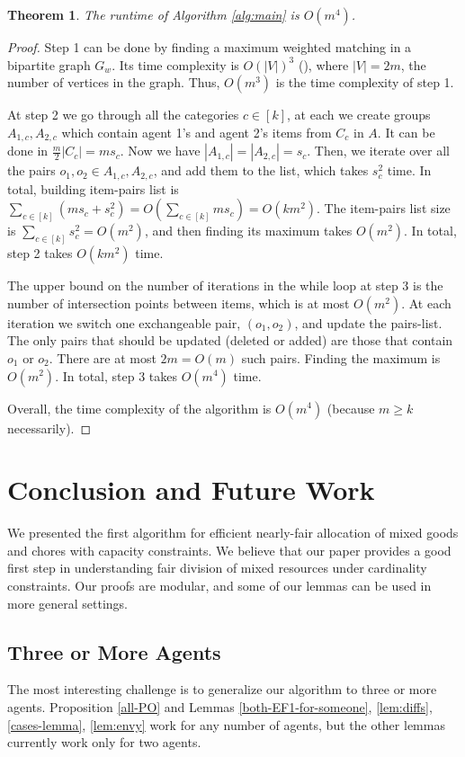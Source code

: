 \documentclass[sigconf]{aamas}
\newtheorem{theorem}{Theorem}[section]
\theoremstyle{definition}
\begin{document}
\begin{theorem}
\label{runtime}
    The runtime of Algorithm \ref{alg:main} is $O(m^4)$.
\end{theorem}
\begin{proof}
Step 1 can be done by finding a maximum weighted matching in a bipartite graph $G_w$. Its time complexity is $O(|V|)^3$ (\citet{fredman1987}), where $|V|=2m$, the number of vertices in the graph.
Thus, $O(m^3)$ is the time complexity of step 1.

At step 2 we go through all the categories $c\in [k]$, at each we create groups $A_{1,c},A_{2,c}$ which contain agent 1's and agent 2's items from $C_c$ in $A$.
It can be done in $\frac{m}{2}|C_c|=ms_c$. 
Now we have $|A_{1,c}|=|A_{2,c}|=s_c$.
Then, we iterate over all the pairs $o_1,o_2\in A_{1,c},A_{2,c}$, and add them to the list, which takes $s_c^2$ time.
In total, building item-pairs list is 
$\sum_{c\in [k]}(ms_c+s_c^2) = O(\sum_{c\in [k]}ms_c) = O(km^2)$.
The item-pairs list size is $\sum_{c\in [k]}s_c^2=O(m^2)$, and then finding its maximum takes $O(m^2)$.
In total, step 2 takes $O(km^2)$ time.

The upper bound on the number of iterations in the while loop at step 3 is the number of intersection points between items, which is at most $O(m^2)$.
At each iteration we switch one exchangeable pair, $(o_1,o_2)$, and update the pairs-list. The only pairs that should be updated (deleted or added) are those that contain $o_1$ or $o_2$. There are at most $2 m=O(m)$ such pairs.
Finding the maximum is $O(m^2)$.
In total, step 3 takes $O(m^4)$ time.

Overall, the time complexity of the algorithm is $O(m^4)$ (because $m\geq k$ necessarily).
\end{proof}

\section{Conclusion and Future Work}
We presented the first algorithm for efficient nearly-fair allocation of mixed goods and chores with capacity constraints.
We believe that our paper provides a good first step in understanding fair division of mixed resources under cardinality constraints. 
Our proofs are modular, and some of our lemmas can be used in more general settings.

\subsection{Three or More Agents}
The most interesting challenge is to generalize our algorithm to three or more agents. 
Proposition \ref{all-PO} and Lemmas \ref{both-EF1-for-someone}, \ref{lem:diffs}, \ref{cases-lemma}, \ref{lem:envy}
work for any number of agents, but the other lemmas currently work only for two agents.
\end{document}

